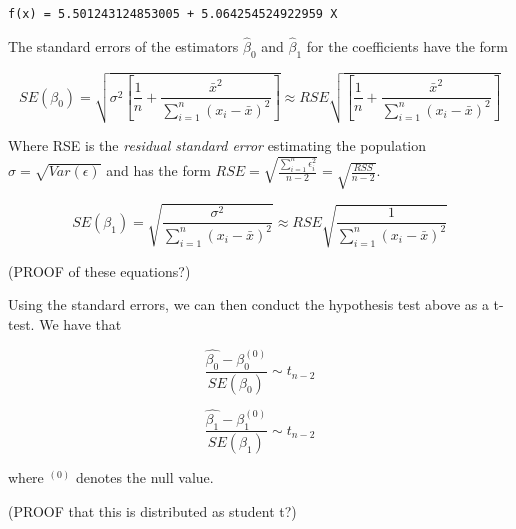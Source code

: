 \documentclass[11pt]{article}
\begin{document}
    \begin{Verbatim}[commandchars=\\\{\}]
f(x) = 5.501243124853005 + 5.064254524922959 X

    \end{Verbatim}

    The standard errors of the estimators \(\hat{\beta}_0\) and
\(\hat{\beta}_1\) for the coefficients have the form

\[SE(\beta_0) = \sqrt{\sigma^2 [\frac{1}{n} + \frac{\bar{x}^2}{\sum_{i=1}^n (x_i - \bar{x})^2}]} \approx  RSE\sqrt{ [\frac{1}{n} + \frac{\bar{x}^2}{\sum_{i=1}^n (x_i - \bar{x})^2}]}\]

Where RSE is the \emph{residual standard error} estimating the
population \(\sigma = \sqrt{Var(\epsilon)}\) and has the form
\(RSE = \sqrt{\frac{\sum_{i=1}^n \epsilon_i^2}{n-2}} = \sqrt{\frac{RSS}{n-2}}\).

\[SE(\beta_1) = \sqrt{   \frac{ \sigma^2 }{ \sum_{i=1}^n (x_i - \bar{x})^2 }   } \approx RSE\sqrt{   \frac{ 1 }{ \sum_{i=1}^n (x_i - \bar{x})^2 }   }\]

(PROOF of these equations?)

Using the standard errors, we can then conduct the hypothesis test above
as a t-test. We have that

\[\frac{ \hat{\beta_0} - \beta_0^{(0)} }{ SE(\beta_0) } \sim t_{n-2}\]

\[\frac{ \hat{\beta_1} - \beta_1^{(0)} }{ SE(\beta_1) } \sim t_{n-2}\]

where \(^{(0)}\) denotes the null value.

(PROOF that this is distributed as student t?)
\end{document}
